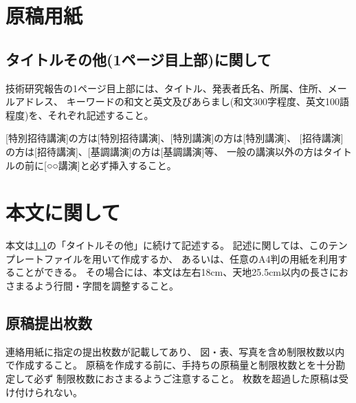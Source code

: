 \section{原稿用紙}
\subsection{タイトルその他(1ページ目上部)に関して}
\label{subsec:intro}
技術研究報告の1ページ目上部には、タイトル、発表者氏名、所属、住所、メールアドレス、
キーワードの和文と英文及びあらまし(和文300字程度、英文100語程度)を、それぞれ記述すること。

[特別招待講演]の方は[特別招待講演]、[特別講演]の方は[特別講演]、
[招待講演]の方は[招待講演]、[基調講演]の方は[基調講演]等、
一般の講演以外の方はタイトルの前に[○○講演]と必ず挿入すること。

\section{本文に関して}
本文は\ref{subsec:intro}の「タイトルその他」に続けて記述する。
記述に関しては、このテンプレートファイルを用いて作成するか、
あるいは、任意のA4判の用紙を利用することができる。
その場合には、本文は左右18cm、天地25.5cm以内の長さにおさまるよう行間・字間を調整すること。

\subsection{原稿提出枚数}
連絡用紙に指定の提出枚数が記載してあり、
図・表、写真を含め制限枚数以内で作成すること。
原稿を作成する前に、手持ちの原稿量と制限枚数とを十分勘定して必ず
制限枚数におさまるようご注意すること。
枚数を超過した原稿は受け付けられない。
